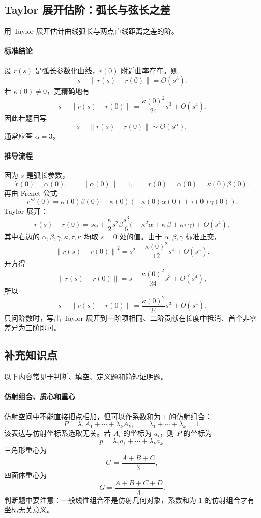 \documentclass[UTF8,12pt,a4paper]{ctexart}
\newcommand{\norm}[1]{\left\lVert #1\right\rVert}
\begin{document}
\subsection{Taylor 展开估阶：弧长与弦长之差}

用 Taylor 展开估计曲线弧长与两点直线距离之差的阶。

\paragraph{标准结论}
设 $r(s)$ 是弧长参数化曲线，$r(0)$ 附近曲率存在。则
\[
s-\norm{r(s)-r(0)}=O(s^3).
\]
若 $\kappa(0)\ne0$，更精确地有
\[
s-\norm{r(s)-r(0)}
=\frac{\kappa(0)^2}{24}s^3+O(s^4).
\]
因此若题目写
\[
s-\norm{r(s)-r(0)}\sim O(s^\alpha),
\]
通常应答 $\alpha=3$。

\paragraph{推导流程}
因为 $s$ 是弧长参数，
\[
\dot r(0)=\alpha(0),\qquad \norm{\alpha(0)}=1,\qquad
\ddot r(0)=\dot\alpha(0)=\kappa(0)\beta(0).
\]
再由 Frenet 公式
\[
r'''(0)=\dot\kappa(0)\beta(0)+\kappa(0)(-\kappa(0)\alpha(0)+\tau(0)\gamma(0)).
\]
Taylor 展开：
\[
r(s)-r(0)=s\alpha+\frac{\kappa}{2}s^2\beta
\frac{s^3}{6}\bigl(-\kappa^2\alpha+\dot\kappa\,\beta+\kappa\tau\,\gamma\bigr)+O(s^4),
\]
其中右边的 $\alpha,\beta,\gamma,\kappa,\tau,\dot\kappa$ 均取 $s=0$ 处的值。由于 $\alpha,\beta,\gamma$ 标准正交，
\[
\norm{r(s)-r(0)}^2
=s^2-\frac{\kappa(0)^2}{12}s^4+O(s^5).
\]
开方得
\[
\norm{r(s)-r(0)}
=s-\frac{\kappa(0)^2}{24}s^3+O(s^4),
\]
所以
\[
s-\norm{r(s)-r(0)}
=\frac{\kappa(0)^2}{24}s^3+O(s^4).
\]
只问阶数时，写出 Taylor 展开到一阶项相同、二阶贡献在长度中抵消、首个非零差异为三阶即可。

\subsection{补充知识点}

以下内容常见于判断、填空、定义题和简短证明题。

\paragraph{仿射组合、质心和重心}
仿射空间中不能直接把点相加，但可以作系数和为 $1$ 的仿射组合：
\[
P=\lambda_1A_1+\cdots+\lambda_kA_k,\qquad
\lambda_1+\cdots+\lambda_k=1.
\]
该表达与仿射坐标系选取无关。若 $A_i$ 的坐标为 $a_i$，则 $P$ 的坐标为
\[
p=\lambda_1a_1+\cdots+\lambda_ka_k.
\]
三角形重心为
\[
G=\frac{A+B+C}{3},
\]
四面体重心为
\[
G=\frac{A+B+C+D}{4}.
\]
判断题中要注意：一般线性组合不是仿射几何对象，系数和为 $1$ 的仿射组合才有坐标无关意义。
\end{document}
